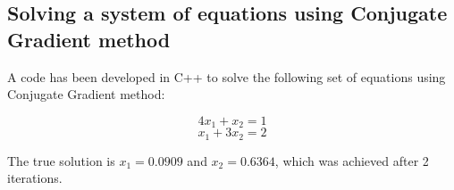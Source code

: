 \documentclass[12pt,a4paper,fleqn]{article}
\begin{document}
\newpage

\subsection*{Solving a system of equations using Conjugate Gradient method}

A code has been developed in C++ to solve the following set of equations using
Conjugate Gradient method:

\begin{equation}
4x_1 + x_2 = 1
\end{equation}
\begin{equation}
x_1 + 3x_2 = 2
\end{equation}

The true solution is $x_1
= 0.0909$ and $x_2 = 0.6364$, which was achieved after 2 iterations.
\end{document}
